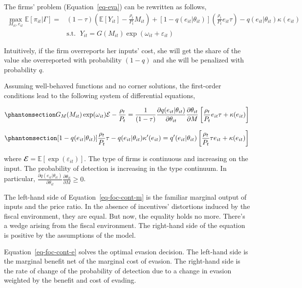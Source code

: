 \documentclass[
  12pt]{article}
\theoremstyle{definition}
\theoremstyle{remark}
\begin{document}
The firms' problem (Equation~\ref{eq-eva}) can be rewritten as follows,
\[
\begin{aligned}
  \max_{M_{it},e_{it}} \mathbb{E}[\pi_{it}|\Gamma] = &(1-\tau)\left(\mathbb{E}[Y_{it}]-\frac{\rho_{t}}{P_t} M_{it}\right)+[1-q(e_{it}|\theta_{it})]\left(\frac{\rho_{t}}{P_t}e_{it}\tau\right)
  -q(e_{it}|\theta_{it})\kappa(e_{it}) \\
  &\text{s.t. }\; Y_{it}=G(M_{it})\exp(\omega_{it}+\varepsilon_{it})
\end{aligned}
\]

Intuitively, if the firm overreports her inputs' cost, she will get the
share of the value she overreported with probability \((1-q)\) and she
will be penalized with probability \(q\).

Assuming well-behaved functions and no corner solutions, the first-order
conditions lead to the following system of differential equations,

\begin{equation}\phantomsection\label{eq-foc-cont-m}{
G_M(M_{it})\exp(\omega_{it})\mathcal{E}-\frac{\rho_{t}}{P_t} = \frac{1}{(1-\tau)}\frac{\partial q(e_{it}|\theta_{it})}{\partial \theta_{it}}\frac{\partial \theta_{it}}{\partial M}\left[\frac{\rho_t}{P_t}e_{it}\tau+\kappa(e_{it})\right]
}\end{equation}

\begin{equation}\phantomsection\label{eq-foc-cont-e}{
[1-q(e_{it}|\theta_{it})]\frac{\rho_t}{P_t}\tau-q(e_{it}|\theta_{it})\kappa'(e_{it})=q'(e_{it}|\theta_{it})\left[\frac{\rho_t}{P_t}\tau e_{it} + \kappa(e_{it})\right]
}\end{equation}

where \(\mathbfcal{E}=\mathbb{E}[\exp(\varepsilon_{it})]\). The type of
firms is continuous and increasing on the input. The probability of
detection is increasing in the type continuum. In particular,
\(\frac{\partial q(e_{it}|\theta_{it})}{\partial \theta_{it}}\frac{\partial \theta_{it}}{\partial M}\ge0\).

The left-hand side of Equation~\ref{eq-foc-cont-m} is the familiar
marginal output of inputs and the price ratio. In the absence of
incentives' distortions induced by the fiscal environment, they are
equal. But now, the equality holds no more. There's a wedge arising from
the fiscal environment. The right-hand side of the equation is positive
by the assumptions of the model.

Equation~\ref{eq-foc-cont-e} solves the optimal evasion decision. The
left-hand side is the marginal benefit net of the marginal cost of
evasion. The right-hand side is the rate of change of the probability of
detection due to a change in evasion weighted by the benefit and cost of
evading.
\end{document}
